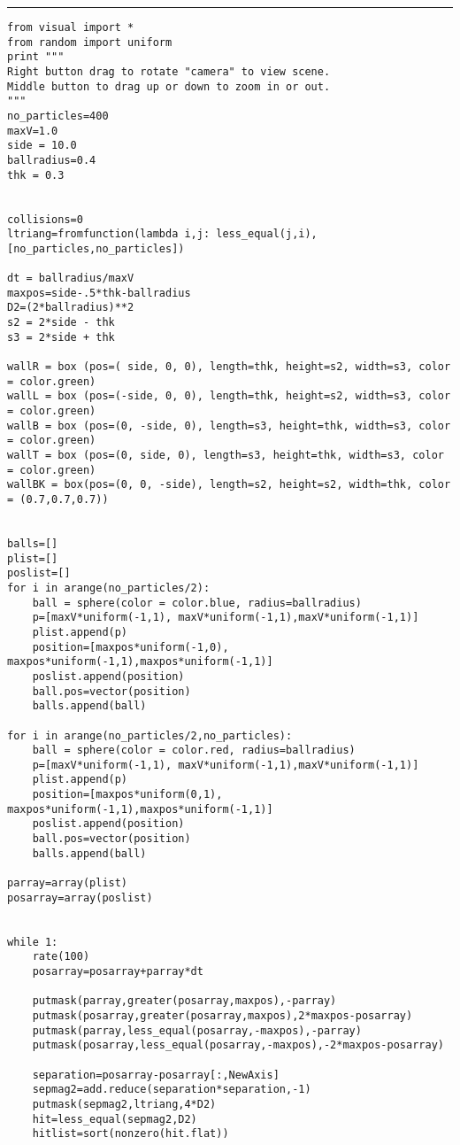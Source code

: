 \documentclass[a4]{article}
\begin{document}
{\color{code}\hrule
\begin{verbatim}
from visual import *
from random import uniform
print """
Right button drag to rotate "camera" to view scene.
Middle button to drag up or down to zoom in or out.
"""
no_particles=400
maxV=1.0
side = 10.0
ballradius=0.4
thk = 0.3

 
collisions=0
ltriang=fromfunction(lambda i,j: less_equal(j,i),[no_particles,no_particles])

dt = ballradius/maxV 
maxpos=side-.5*thk-ballradius 
D2=(2*ballradius)**2 
s2 = 2*side - thk 
s3 = 2*side + thk 

wallR = box (pos=( side, 0, 0), length=thk, height=s2, width=s3, color = color.green) 
wallL = box (pos=(-side, 0, 0), length=thk, height=s2, width=s3, color = color.green) 
wallB = box (pos=(0, -side, 0), length=s3, height=thk, width=s3, color = color.green) 
wallT = box (pos=(0, side, 0), length=s3, height=thk, width=s3, color = color.green) 
wallBK = box(pos=(0, 0, -side), length=s2, height=s2, width=thk, color = (0.7,0.7,0.7)) 

 
balls=[]
plist=[] 
poslist=[] 
for i in arange(no_particles/2): 
    ball = sphere(color = color.blue, radius=ballradius)  
    p=[maxV*uniform(-1,1), maxV*uniform(-1,1),maxV*uniform(-1,1)]
    plist.append(p) 
    position=[maxpos*uniform(-1,0), maxpos*uniform(-1,1),maxpos*uniform(-1,1)]
    poslist.append(position) 
    ball.pos=vector(position) 
    balls.append(ball)

for i in arange(no_particles/2,no_particles): 
    ball = sphere(color = color.red, radius=ballradius)  
    p=[maxV*uniform(-1,1), maxV*uniform(-1,1),maxV*uniform(-1,1)]
    plist.append(p) 
    position=[maxpos*uniform(0,1), maxpos*uniform(-1,1),maxpos*uniform(-1,1)]
    poslist.append(position) 
    ball.pos=vector(position) 
    balls.append(ball) 

parray=array(plist) 
posarray=array(poslist)  


while 1: 
    rate(100) 
    posarray=posarray+parray*dt 

    putmask(parray,greater(posarray,maxpos),-parray) 
    putmask(posarray,greater(posarray,maxpos),2*maxpos-posarray) 
    putmask(parray,less_equal(posarray,-maxpos),-parray) 
    putmask(posarray,less_equal(posarray,-maxpos),-2*maxpos-posarray) 

    separation=posarray-posarray[:,NewAxis] 
    sepmag2=add.reduce(separation*separation,-1) 
    putmask(sepmag2,ltriang,4*D2) 
    hit=less_equal(sepmag2,D2) 
    hitlist=sort(nonzero(hit.flat)) 


\end{verbatim}}
\end{document}
